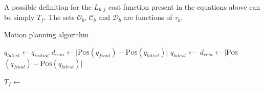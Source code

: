 A possible definition for the $L_{b,f}$ cost function present in the equations above can be simply $T_f$.
The sets $\mathcal{O}_b$, $\mathcal{C}_b$ and $\mathcal{D}_b$ are functions of
$\tau_k$.

\begin{algorithm}
    \caption{Motion planning algorithm\label{cod:algo}}
    \label{swpa}
    \begin{algorithmic}[1] %
	    \State $q_{latest} \gets q_{initial}$
	    \State $d_{rem} \gets |${\scshape Pos}$(q_{final}) - ${\scshape Pos}$(q_{latest})|$
	    \State {}
		\State $q_{latest} \gets $
		\State $d_{rem} \gets |${\scshape Pos}$(q_{final}) - ${\scshape Pos}$(q_{latest})|$
		
	    \EndWhile\label{planningwhile}
	    \State {}
	    \State $T_f \gets $
	    
        \EndProcedure
    \end{algorithmic}
\end{algorithm}


